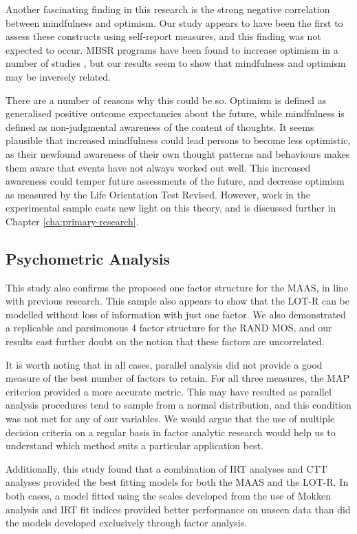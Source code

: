 \documentclass{article}
\begin{document}
Another fascinating finding in this research is the strong negative correlation
between mindfulness and optimism.  Our study appears to have been the first to assess
these constructs using self-report measures, and this finding was not expected to occur.
MBSR programs have been found to increase optimism in a number of studies \cite{Carson2004},
but our results seem to show that mindfulness and optimism may be inversely related.


There are a number of reasons why this could be so.  Optimism is defined as generalised positive outcome expectancies about the future,
while mindfulness is defined as non-judgmental awareness of the content of thoughts.
It seems plausible that increased mindfulness could lead persons to become less optimistic,
 as their newfound awareness of their own thought patterns and behaviours makes them aware
that events have not always worked out well.  This increased awareness could temper future
assessments of the future, and decrease optimism as measured by the Life Orientation Test Revised. However, work in the experimental sample casts new light on this theory, and is discussed further in Chapter \ref{cha:primary-research}. 

\subsection{Psychometric Analysis}
\label{sec:psych-analys}



This study also confirms the proposed one factor structure for the MAAS, in line with previous research.
This sample also appears to show that the LOT-R can be modelled without loss of information with
just one factor.  We also demonstrated a replicable and parsimonous 4 factor structure for the RAND MOS,
and our results cast further doubt on the notion that these factors are uncorrelated.

It is worth noting that in all cases, parallel analysis did not provide a good measure of
the best number of factors to retain.  For all three measures, the MAP criterion provided
a more accurate metric.  This may have resulted as parallel analysis procedures tend
to sample from a normal distribution, and this condition was not met for any of our
variables.  We would argue that the use of multiple decision criteria on a regular basis
in factor analytic research would help us to understand which method suits a particular
application best.

Additionally, this study found that a combination of IRT analyses and CTT analyses provided the best fitting models for both the MAAS and the LOT-R. In both cases, a model fitted using the scales developed from the use of Mokken analysis and IRT fit indices provided better performance on unseen data than did the models developed exclusively through factor analysis. 
\end{document}
